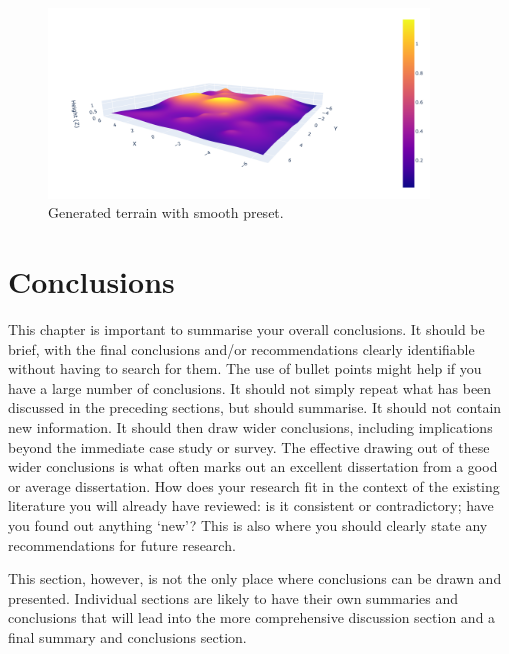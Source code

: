 \documentclass[a4paper,12pt]{article}
\begin{document}
\begin{figure}[H]
  \centering
  \includegraphics[width=0.9\textwidth]{fig/smooth_terrain.png}
  \caption{Generated terrain with smooth preset.}
\end{figure}
\section{Conclusions}
\label{sec:conclusions}


This chapter is important to summarise your overall conclusions. It should be brief, with the final
conclusions and/or recommendations clearly identifiable without having to search for them. The use
of bullet points might help if you have a large number of conclusions. It should not simply repeat
what has been discussed in the preceding sections, but should summarise. It should not contain new information. It should then draw wider conclusions, including implications beyond the immediate case study or survey. The effective drawing out of these wider conclusions is what often marks out an excellent dissertation from a good or average dissertation. How does your research fit in the context of the existing literature you will already have reviewed: is it consistent or contradictory; have you found out anything `new'? This is also where you should clearly state any recommendations for future research.

This section, however, is not the only place where conclusions can be drawn and presented.  Individual sections are likely to have their own summaries and conclusions that will lead into the more comprehensive discussion section and a final summary and conclusions section.


\clearpage

\end{document}
